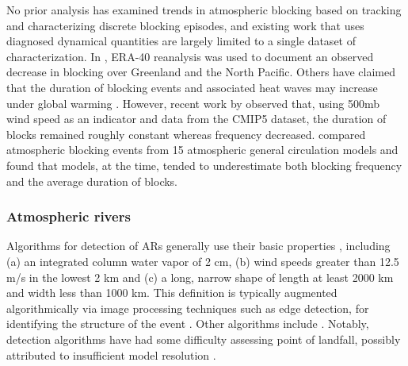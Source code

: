 \documentclass[11pt]{article}
\newcommand\citep{\cite}
\begin{document}
No prior analysis has examined trends in atmospheric blocking based on tracking and characterizing discrete blocking episodes, and existing work that uses diagnosed dynamical quantities are largely limited to a single dataset of characterization.  In \cite{croci2007multifaceted}, ERA-40 reanalysis was used to document an observed decrease in blocking over Greenland and the North Pacific.  Others have claimed that the duration of blocking events and associated heat waves may increase under global warming \citep{lupo1997climatological, beniston20042003}.  However, recent work by \cite{barnes2012methodology} observed that, using 500mb wind speed as an indicator and data from the CMIP5 dataset, {\color{blue}the} duration of blocks remained roughly constant whereas frequency decreased.  \cite{dandrea1998northern} compared atmospheric blocking events from 15 atmospheric general circulation models and found that models, at the time, tended to underestimate both blocking frequency and the average duration of blocks.


\subsubsection{Atmospheric rivers}

Algorithms for detection of ARs generally use their basic properties \citep{ralph2011storms}, including (a) an integrated column water vapor of 2 cm, (b) wind speeds greater than 12.5 m/s in the lowest 2 km and (c) a long, narrow shape of length at least 2000 km and width less than 1000 km.  This definition is typically augmented algorithmically via image processing techniques such as edge detection, for identifying the structure of the event \citep{wick2013description}.  Other algorithms include \cite{zhu1998proposed, bao2006interpretation, dirmeyer2007characterization, gimeno2010origin, lavers2012detection}.   Notably, detection algorithms have had some difficulty assessing point of landfall, possibly attributed to insufficient model resolution \citep{wick2014implementation}.
\end{document}
